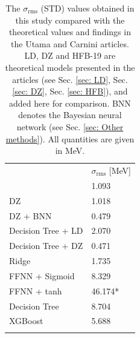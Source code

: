 \documentclass[numberedappendix, twocolappendix]{emulateapj}
\begin{document}
\begin{table}[!htb]
\begin{center}
\caption{The $\sigma_{\mathrm{rms}}$ (STD) values obtained in this study compared with the theoretical values and findings in the Utama \cite{utama2017} and Carnini \cite{trees in nuclear} articles. LD, DZ and HFB-19 are theoretical models presented in the articles (see Sec. \ref{sec: LD}, Sec. \ref{sec: DZ}, Sec. \ref{sec: HFB}), and added here for comparison. BNN denotes the Bayesian neural network (see Sec. \ref{sec: Other methods}). All quantities are given in MeV.}
\label{tab:comparison}  
\begin{tabular}{ll}
\cline{2-2}\noalign{\smallskip}\cline{2-2}\noalign{\smallskip} 
& $\sigma_{\mathrm{rms}}$ [MeV] \\ \noalign{\smallskip}\hline\noalign{\smallskip}
\hline\noalign{\smallskip}
\multicolumn{1}{l|}{HFB-19 \cite{utama2017}} & 1.093 \\
\multicolumn{1}{l|}{DZ \cite{utama2017}} & 1.018 \\
\multicolumn{1}{l|}{DZ + BNN \cite{utama2017}} & 0.479 \\
\multicolumn{1}{l|}{Decision Tree + LD \cite{trees in nuclear}} & 2.070 \\
\multicolumn{1}{l|}{Decision Tree + DZ \cite{trees in nuclear}} & 0.471 \\
\multicolumn{1}{l|}{Ridge} & 1.735\\
\multicolumn{1}{l|}{FFNN + Sigmoid} & 8.329 \\
\multicolumn{1}{l|}{FFNN + tanh} & 46.174* \\
\multicolumn{1}{l|}{Decision Tree} & 8.704 \\
\multicolumn{1}{l|}{XGBoost} & 5.688 \\
\noalign{\smallskip}\hline
\end{tabular}
\end{center}
\end{table}
\end{document}
